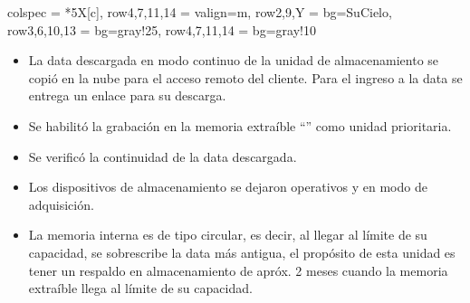 \begin{longtblr}{
		colspec = {*{5}{X[c]}},
		row{4,7,11,14} = {valign=m},
		row{2,9,Y} = {bg=SuCielo},
		row{3,6,10,13} = {bg=gray!25},
		row{4,7,11,14} = {bg=gray!10}
	}
\begin{itemize}
		\item La data descargada en modo continuo de la unidad de almacenamiento se copió en la nube para el acceso remoto del cliente. Para el ingreso a la data se entrega un enlace para su descarga.
		\item Se habilitó la grabación en la memoria extraíble ``'' como unidad prioritaria.
		\item Se verificó la continuidad de la data descargada.
		\item Los dispositivos de almacenamiento se dejaron operativos y en modo de adquisición.
		\item La memoria interna es de tipo circular, es decir, al llegar al límite de su capacidad, se sobrescribe la data más antigua, el propósito de esta unidad es tener un respaldo en almacenamiento de apróx. 2 meses cuando la memoria extraíble llega al límite de su capacidad.
	\end{itemize}
\end{longtblr}